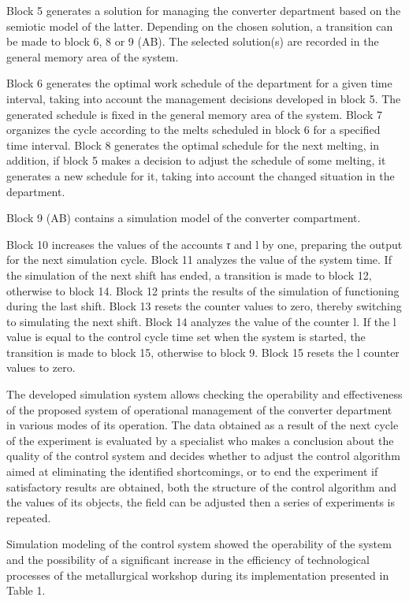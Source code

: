 \begin{multicols}{2}
Block 5 generates a solution for managing the converter department based
on the semiotic model of the latter. Depending on the chosen solution, a
transition can be made to block 6, 8 or 9 (AB). The selected solution(s)
are recorded in the general memory area of the system.

Block 6 generates the optimal work schedule of the department for a
given time interval, taking into account the management decisions
developed in block 5. The generated schedule is fixed in the general
memory area of the system. Block 7 organizes the cycle according to the
melts scheduled in block 6 for a specified time interval. Block 8
generates the optimal schedule for the next melting, in addition, if
block 5 makes a decision to adjust the schedule of some melting, it
generates a new schedule for it, taking into account the changed
situation in the department.

Block 9 (AB) contains a simulation model of the converter compartment.

Block 10 increases the values of the accounts \emph{τ} and l by one,
preparing the output for the next simulation cycle. Block 11 analyzes
the value of the system time. If the simulation of the next shift has
ended, a transition is made to block 12, otherwise to block 14. Block 12
prints the results of the simulation of functioning during the last
shift. Block 13 resets the counter values to zero, thereby switching to
simulating the next shift. Block 14 analyzes the value of the counter l.
If the l value is equal to the control cycle time set when the system is
started, the transition is made to block 15, otherwise to block 9. Block
15 resets the l counter values to zero.

The developed simulation system allows checking the operability and
effectiveness of the proposed system of operational management of the
converter department in various modes of its operation. The data
obtained as a result of the next cycle of the experiment is evaluated by
a specialist who makes a conclusion about the quality of the control
system and decides whether to adjust the control algorithm aimed at
eliminating the identified shortcomings, or to end the experiment if
satisfactory results are obtained, both the structure of the control
algorithm and the values of its objects, the field can be adjusted then
a series of experiments is repeated.

Simulation modeling of the control system showed the operability of the
system and the possibility of a significant increase in the efficiency
of technological processes of the metallurgical workshop during its
implementation presented in Table 1.
\end{multicols}

